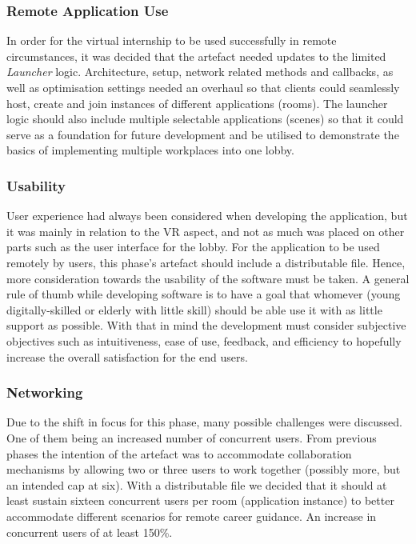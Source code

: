 \subsubsection{Remote Application Use}
In order for the virtual internship to be used successfully in remote circumstances, it was decided that the artefact needed updates to the limited \textit{Launcher} logic. Architecture, setup, network related methods and callbacks, as well as optimisation settings needed an overhaul so that clients could seamlessly host, create and join instances of different applications (rooms). The launcher logic should also include multiple selectable applications (scenes) so that it could serve as a foundation for future development and be utilised to demonstrate the basics of implementing multiple workplaces into one lobby.   

\subsubsection{Usability}
User experience had always been considered when developing the application, but it was mainly in relation to the VR aspect, and not as much was placed on other parts such as the user interface for the lobby. For the application to be used remotely by users, this phase's artefact should include a distributable file. Hence, more consideration towards the usability of the software must be taken. A general rule of thumb while developing software is to have a goal that whomever (young digitally-skilled or elderly with little skill) should be able use it with as little support as possible. With that in mind the development must consider subjective objectives such as intuitiveness, ease of use, feedback, and efficiency to hopefully increase the overall satisfaction for the end users.



\subsubsection{Networking}
Due to the shift in focus for this phase, many possible challenges were discussed. One of them being an increased number of concurrent users. From previous phases the intention of the artefact was to accommodate collaboration mechanisms by allowing two or three users to work together (possibly more, but an intended cap at six). With a distributable file we decided that it should at least sustain sixteen concurrent users per room (application instance) to better accommodate different scenarios for remote career guidance. An increase in concurrent users of at least 150\%. 

